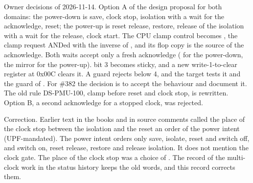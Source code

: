 \begin{record}

Owner decisions of 2026-11-14. Option A of the design proposal for both domains: the power-down is save, clock stop, isolation with a wait for the acknowledge, reset; the power-up is reset release, restore, release of the isolation with a wait for the release, clock start. The CPU clamp control becomes , the clamp request  ANDed with the inverse of , and its flop copy  is the source of the acknowledge. Both waits accept only a fresh acknowledge ( for the power-down, the mirror  for the power-up).  bit 3 becomes sticky, and a new write-1-to-clear register  at 0x00C clears it. A guard rejects  below 4, and the target  tests it and the guard of . For \#382 the decision is to accept the behaviour and document it. The old rule DS-PMU-100, clamp before reset and clock stop, is rewritten. Option B, a second acknowledge for a stopped clock, was rejected.

\end{record}

\begin{record}

Correction. Earlier text in the books and in source comments called the place of the clock stop between the isolation and the reset an order of the power intent (UPF-mandated). The power intent  orders only save, isolate, reset and switch off, and switch on, reset release, restore and release isolation. It does not mention the clock gate. The place of the clock stop was a choice of . The record of the multi-clock work in the status history keeps the old words, and this record corrects them.

\end{record}

